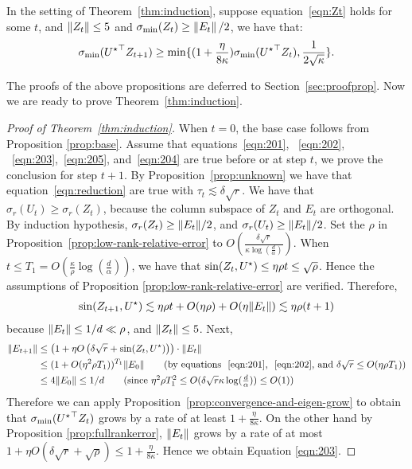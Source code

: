 \begin{prop}\label{prop:convergence-and-eigen-grow}
	In the setting of Theorem~\ref{thm:induction}, suppose equation~\eqref{eqn:Zt} holds for some $t$, and $\left\|Z_t\right\| \leq 5$ and $\sigma_{\min}(Z_{t}) \geq \left\|E_t\right\| / 2$, we have that:
	\begin{align*}
		\sigma_{\min}({{U}^\star}^\top Z_{t + 1})\geq \min\{(1+\frac{\eta}{8\kappa})\sigma_{\min}({{U}^\star}^\top  Z_t), \frac 1 {2\sqrt{\kappa}}\}.
	\end{align*}
\end{prop}
\noindent The proofs of the above propositions are deferred to Section~\ref{sec:proofprop}. Now we are ready to prove Theorem~\ref{thm:induction}. 
\begin{proof}[Proof of Theorem~\ref{thm:induction}]
	When $t = 0$, the base case follows from Proposition \ref{prop:base}.
	Assume that equations~\eqref{eqn:201}, ~\eqref{eqn:202}, ~\eqref{eqn:203},~\eqref{eqn:205}, and~\eqref{eqn:204} are true before or at step $t$,
	we prove the conclusion for step $t+1$.
	By Proposition~\ref{prop:unknown} we have that equation~\ref{eqn:reduction} are true with $\tau_t \lesssim \delta \sqrt{r}$.
	We have that $\sigma_r(U_t) \ge \sigma_r(Z_t)$, because the column subspace of $Z_t$ and $E_t$ are orthogonal.
	By induction hypothesis, $\sigma_r(Z_t) \ge \|E_t\| / 2$, and $\sigma_r(U_t) \ge \|E_t\| / 2$.
	Set the $\rho$ in Proposition~\ref{prop:low-rank-relative-error} to $O(\frac {\delta\sqrt{r}}{\kappa\log(\frac d {\alpha})})$.
	When $t \leq T_1 = O(\frac{\kappa}{\rho} \log(\frac d {\alpha}))$,
	we have that $\sin(Z_t, {{U}^\star}) \leq \eta\rho t \le \sqrt{\rho}$.
	Hence the assumptions of Proposition \ref{prop:low-rank-relative-error} are verified.	Therefore,
	\begin{align*}
		\sin(Z_{t+1}, {{U}^\star}) \lesssim \eta \rho t + O(\eta \rho) +  O(\eta \|E_t\|) \lesssim \eta\rho(t+1)
	\end{align*}
	because $\|E_t\| \le 1/d \ll \rho$, and $\|Z_t\| \le 5$.
	Next,
	\begin{align}
		\Norm{E_{t+1}} & \le \left(1 + \eta O\left(\delta \sqrt{r} + \sin(Z_{t}, \bUg)  \right) \right)\cdot \Norm{E_t}\nonumber\\
		& \le (1+O(\eta^2\rho T_1))^{T_1} \|E_0\| \tag{by equations ~\eqref{eqn:201}, ~\eqref{eqn:202}, and $\delta\sqrt r \le O(\eta\rho T_1)$}\\
		& \le 4\|E_0\| \le 1/d \tag{since $\eta^2\rho T_1^2 \le O(\delta \sqrt r \kappa \log(\frac d {\alpha})) \le O(1)$}
	\end{align}
	Therefore we can apply Proposition~\ref{prop:convergence-and-eigen-grow}
	to obtain that $\sigma_{\min}({{U}^\star}^{\top} Z_t)$ grows by a rate of at least $1 + \frac {\eta}{8\kappa}$.
	On the other hand by Proposition \ref{prop:fullrankerror},
	$\|E_t\|$ grows by a rate of at most $1 + \eta O(\delta \sqrt r + \sqrt {\rho}) \le 1 + \frac{\eta}{8\kappa}$.
	Hence we obtain Equation \ref{eqn:203}.
\end{proof}


